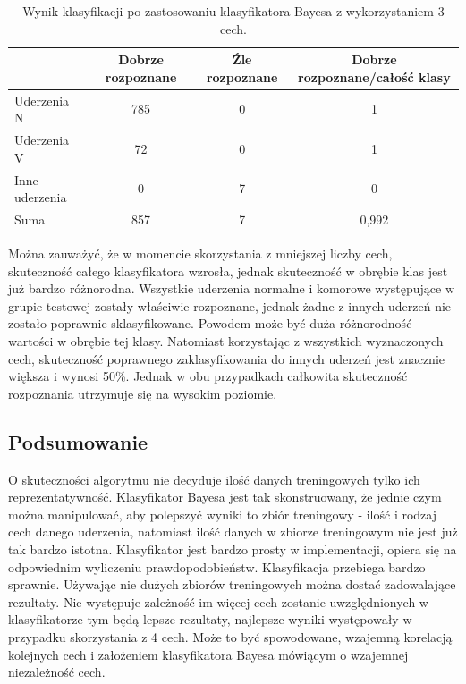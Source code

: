 \documentclass[[10pt,a4paper]{article}
\begin{document}
\begin{table}[h]
\centering
\caption{Wynik klasyfikacji po zastosowaniu klasyfikatora Bayesa z wykorzystaniem 3 cech.}
    \begin{tabular}
{|l|c|c|c|}
    \hline
    ~              & Dobrze rozpoznane & Źle rozpoznane &  Dobrze rozpoznane/całość klasy \\ \hline
    Uderzenia N    & 785                      & 0                          & 1                     \\ \hline
    Uderzenia V    & 72                       & 0                           & 1                         \\ \hline
    Inne uderzenia & 0                       & 7                           & 0 \\ \hline
    Suma           & 857                      & 7                          & 0,992                   \\ \hline
    \end{tabular}
\end{table}

Można zauważyć, że w momencie skorzystania z mniejszej liczby cech, skuteczność całego klasyfikatora wzrosła, jednak skuteczność w obrębie klas jest już bardzo różnorodna. Wszystkie uderzenia normalne i komorowe występujące w grupie testowej zostały właściwie rozpoznane, jednak żadne z innych uderzeń nie zostało poprawnie sklasyfikowane. Powodem może być duża różnorodność wartości w obrębie tej klasy. Natomiast korzystając z wszystkich wyznaczonych cech, skuteczność poprawnego zaklasyfikowania do innych uderzeń jest znacznie większa i wynosi 50\%. Jednak w obu przypadkach całkowita skuteczność rozpoznania utrzymuje się na wysokim poziomie.
\subsection{Podsumowanie} 
O skuteczności algorytmu nie decyduje ilość danych treningowych tylko ich reprezentatywność. 
Klasyfikator Bayesa jest tak skonstruowany, że jednie czym można manipulować, aby polepszyć wyniki to zbiór treningowy - ilość i  rodzaj cech danego uderzenia, natomiast ilość danych w zbiorze treningowym nie jest już tak bardzo istotna. Klasyfikator jest bardzo prosty w implementacji, opiera się na odpowiednim wyliczeniu prawdopodobieństw. Klasyfikacja przebiega bardzo sprawnie. Używając nie dużych zbiorów treningowych można dostać zadowalające rezultaty. Nie występuje zależność im więcej cech zostanie uwzględnionych w klasyfikatorze tym będą lepsze rezultaty, najlepsze wyniki występowały w przypadku skorzystania z 4 cech. Może to być spowodowane, wzajemną korelacją kolejnych cech i założeniem klasyfikatora Bayesa mówiącym o wzajemnej niezależność cech.
 
\end{document}
